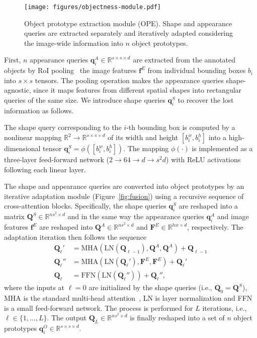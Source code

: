 \documentclass[10pt,twocolumn,letterpaper]{article}
\begin{document}
\begin{figure}[!h]
    \centering
    \texttt{[image: figures/objectness-module.pdf]}
    \caption{Object prototype extraction module (OPE). Shape and appearance queries are extracted separately and iteratively adapted considering the image-wide information into $n$ object prototypes.
    }
    \label{fig:objectness}
\end{figure}

First, $n$ appearance queries $\mathbf{q}_{i}^{A} \in \mathbb{R}^{s\times s \times d}$ are extracted from the annotated objects by RoI pooling~\cite{maskrcnn} the image features $\mathbf{f}^{E}$ from individual bounding boxes $b_i$ into  $s \times s$ tensors.
The pooling operation makes the appearance queries shape-agnostic, since it maps features from different spatial shapes into rectangular queries of the same size.
We introduce shape queries $\mathbf{q}_{i}^{S}$ to recover the lost information as follows. 

The shape query corresponding to the $i$-th bounding box is computed by a nonlinear mapping $\mathbb{R}^2 \rightarrow \mathbb{R}^{s \times s \times d}$ of its width  and height $[b_i^w, b_i^h]$ into a high-dimensional tensor $\mathbf{q}_{i}^{S} = \phi([b_i^w, b_i^h])$. The mapping $\phi(\cdot)$ is implemented as a three-layer feed-forward network ($2 \rightarrow 64 \rightarrow d \rightarrow s^2 d$) with ReLU activations following each linear layer.

The shape and appearance queries are converted into object prototypes by an iterative adaptation module (Figure~\ref{fig:fusion}) using a recursive sequence of cross-attention blocks. 
Specifically, the shape queries $\mathbf{q}_{i}^{S}$ are reshaped into a matrix $\mathbf{Q}^{S} \in \mathbb{R}^{n s^2 \times d}$ and in the same way the appearance queries $\mathbf{q}_{i}^{A}$ and image features $\mathbf{f}^{E}$ are reshaped into $\mathbf{Q}^{A} \in \mathbb{R}^{n s^2 \times d}$ and $\mathbf{F}^{E} \in \mathbb{R}^{hw \times d}$, respectively. The adaptation iteration then follows the sequence
\begin{align}
    \mathbf{Q}_\ell' & = \text{MHA}(\text{LN}(\mathbf{Q}_{\ell-1}), \mathbf{Q}^{A},  \mathbf{Q}^{A}) + \mathbf{Q}_{\ell-1} \label{eq:fusion1}\\
    \mathbf{Q}_\ell'' & = \text{MHA}(\text{LN}(\mathbf{Q}_\ell'), \mathbf{F}^{E},  \mathbf{F}^{E}) + \mathbf{Q}_\ell' \label{eq:fusion2}\\
    \mathbf{Q}_\ell & = \text{FFN}(\text{LN}(\mathbf{Q}_\ell'')) + \mathbf{Q}_\ell''\label{eq:fusion3},
\end{align}
where the inputs at $\ell = 0$ are initialized by the shape queries (i.e., $\mathbf{Q}_0 = \mathbf{Q}^{S}$), MHA is the standard multi-head attention~\cite{transformer}, LN is layer normalization and FFN is a small feed-forward network. The process is performed for $L$ iterations, i.e., $\ell \in \{1,...,L\}$.
The output $\mathbf{Q}_L \in \mathbb{R}^{n s^2 \times d}$ is finally reshaped into a set of $n$ object prototypes $\mathbf{q}_{i}^{O} \in \mathbb{R}^{s\times s\times d}$.
\end{document}
